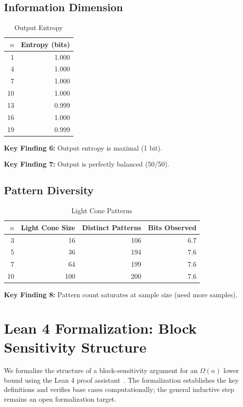 \documentclass[11pt]{article}
\begin{document}
\subsection{Information Dimension}

\begin{table}[t]
\centering
\caption{Output Entropy}
\label{tab:entropy}
\begin{tabular}{@{}rr@{}}
\toprule
$n$ & Entropy (bits) \\
\midrule
1  & 1.000 \\
4  & 1.000 \\
7  & 1.000 \\
10 & 1.000 \\
13 & 0.999 \\
16 & 1.000 \\
19 & 0.999 \\
\bottomrule
\end{tabular}
\end{table}

\textbf{Key Finding 6:} Output entropy is maximal (1 bit).

\textbf{Key Finding 7:} Output is perfectly balanced (50/50).

\subsection{Pattern Diversity}

\begin{table}[t]
\centering
\caption{Light Cone Patterns}
\label{tab:patterns}
\begin{tabular}{@{}rrrr@{}}
\toprule
$n$ & Light Cone Size & Distinct Patterns & Bits Observed \\
\midrule
3  & 16   & 106 & 6.7 \\
5  & 36   & 194 & 7.6 \\
7  & 64   & 199 & 7.6 \\
10 & 100  & 200 & 7.6 \\
\bottomrule
\end{tabular}
\end{table}

\textbf{Key Finding 8:} Pattern count saturates at sample size (need more samples).

\section{Lean 4 Formalization: Block Sensitivity Structure}

We formalize the structure of a block-sensitivity argument for an $\Omega(n)$ lower bound using the Lean 4 proof assistant~\citep{moura_2021}. The formalization establishes the key definitions and verifies base cases computationally; the general inductive step remains an open formalization target.
\end{document}
